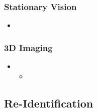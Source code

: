 \subsubsection{Stationary Vision}
\begin{itemize}
\item 
\end{itemize}

\subsubsection{3D Imaging}
\begin{itemize}
\item 
	\begin{itemize}
	\item 
	\end{itemize}
\end{itemize}

\subsection{Re-Identification}
